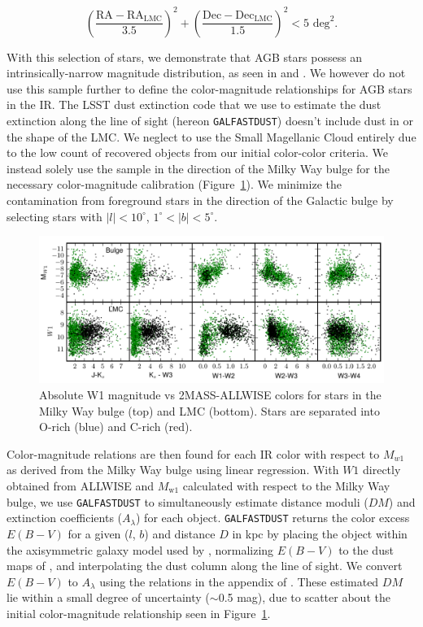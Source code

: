 $$\displaystyle\left(\frac{\text{RA} - \text{RA}_\text{LMC}}{3.5}\right)^2 + \left(\frac{\text{Dec} - \text{Dec}_\text{LMC}}{1.5} \right)^2 < 5 \text{ deg}^2.$$

\noindent With this selection of stars, we demonstrate that AGB stars possess an intrinsically-narrow magnitude distribution, as seen in \cite{1985A&A...152L...1H} and \cite{2002MNRAS.337..749J}. We however do not use this sample further to define the color-magnitude relationships for AGB stars in the IR. The LSST dust extinction code that we use to estimate the dust extinction along the line of sight (hereon {\tt GALFASTDUST}) doesn't include dust in or the shape of the LMC. We neglect to use the Small Magellanic Cloud entirely due to the low count of recovered objects from our initial color-color criteria.  We instead solely use the sample in the direction of the Milky Way bulge for the necessary color-magnitude calibration (Figure~\ref{fig:colormag}). We minimize the contamination from foreground stars in the direction of the Galactic bulge by selecting stars with $\lvert l\rvert < 10^\circ$, $1^\circ < \lvert b \rvert < 5^\circ$. 

\begin{figure}[h]
\includegraphics[width=6in]{figs/bulge_lmc_colormag.pdf}
\caption{Absolute W1 magnitude vs 2MASS-ALLWISE colors for stars in the Milky Way bulge (top) and LMC (bottom). Stars are separated into O-rich (blue) and C-rich (red).}
\label{fig:colormag}
\end{figure}

Color-magnitude relations are then found for each IR color with respect to $M_{w1}$ as derived from the Milky Way bulge using linear regression. With $W1$ directly obtained from ALLWISE and $M_\text{w1}$ calculated with respect to the Milky Way bulge, we use {\tt GALFASTDUST} to simultaneously estimate distance moduli ($DM$) and extinction coefficients ($A_\lambda$) for each object. {\tt GALFASTDUST} returns the color excess $E(B-V)$ for a given ($l$, $b$) and distance $D$ in kpc by placing the object within the axisymmetric galaxy model used by \cite{2005AJ....130..659A}, normalizing $E(B-V)$ to the dust maps of \cite{1998ApJ...500..525S}, and interpolating the dust column along the line of sight. We convert $E(B-V)$ to $A_\lambda$ using the relations in the appendix of \cite{2014MNRAS.440.3430D}. These estimated $DM$ lie within a small degree of uncertainty ($\sim$0.5 mag), due to scatter about the initial color-magnitude relationship seen in Figure~\ref{fig:colormag}.

